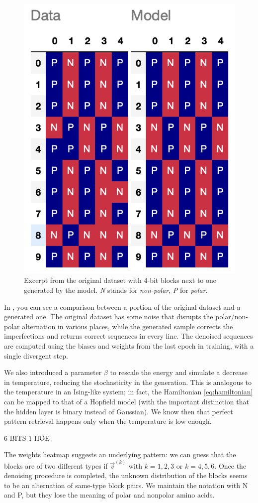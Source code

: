 \documentclass[prl, twocolumn]{revtex4-2}
\begin{document}
\begin{figure}
    \centering
    \includegraphics[width=0.6\linewidth]{plots/PN4bits.png}
    \caption{Excerpt from the original dataset with 4-bit blocks next to one generated
    by the model. \emph{N} stands for \emph{non-polar}, \emph{P} for \emph{polar}.}
    \label{fig:4-bit-PNP}
\end{figure}

In , you can see a comparison between a portion of the original dataset and a generated one. The original dataset has some noise that disrupts the polar/non-polar alternation in various places, while the generated sample corrects the
imperfections and returns correct sequences in every line. The denoised sequences are computed using the biases and weights from the last epoch in training, with a single divergent step.

We also introduced a parameter $\beta$ to rescale the energy and simulate a decrease in temperature, reducing the 
stochasticity in the generation. This is analogous to the temperature in an Ising-like system; in fact, 
the Hamiltonian \eqref{eq:hamiltonian} can be mapped to that of a Hopfield model \cite{Mehta2019} (with the important distinction that the hidden layer is binary instead of Gaussian). We know then that perfect pattern retrieval happens only when the temperature is low enough.



6 BITS 1 HOE

The weights heatmap suggests an underlying pattern: we can guess that the blocks are of two different types if $\vec{v}^{(k)}$ with $k=1,2,3$ or $k=4,5,6$. Once the denoising procedure is completed, the unknown distribution of the blocks seems to be an alternation of same-type block pairs. We maintain the notation with N and P, but they lose the meaning of polar and nonpolar amino acids.




\end{document}
